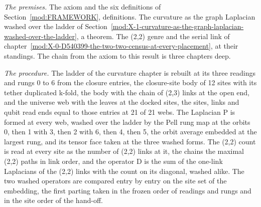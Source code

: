 \begin{chproof}
\textit{The premises.} The axiom and the six definitions of Section~\ref{mod:FRAMEWORK}, definitions. The curvature as the graph Laplacian washed over the ladder of Section~\ref{mod:X-1-curvature-as-the-graph-laplacian-washed-over-the-ladder}, a theorem. The (2,2) genre and the serial link of chapter~\ref{mod:X-0-D540399-the-two-two-census-at-every-placement}, at their standings. The chain from the axiom to this result is three chapters deep.

\textit{The procedure.} The ladder of the curvature chapter is rebuilt at its three readings and rungs 0 to 6 from the closure entries, the closure-site body of 12 sites with its tether duplicated k-fold, the body with the chain of (2,3) links at the open end, and the universe web with the leaves at the docked sites, the sites, links and qubit read ends equal to those entries at 21 of 21 webs. The Laplacian P is formed at every web, washed over the ladder by the Pell rung map at the orbits 0, then 1 with 3, then 2 with 6, then 4, then 5, the orbit average embedded at the largest rung, and its tensor face taken at the three washed forms. The (2,2) count is read at every site as the number of (2,2) links at it, the chains the maximal (2,2) paths in link order, and the operator D is the sum of the one-link Laplacians of the (2,2) links with the count on its diagonal, washed alike. The two washed operators are compared entry by entry on the site set of the embedding, the first parting taken in the frozen order of readings and rungs and in the site order of the hand-off.


\end{chproof}
